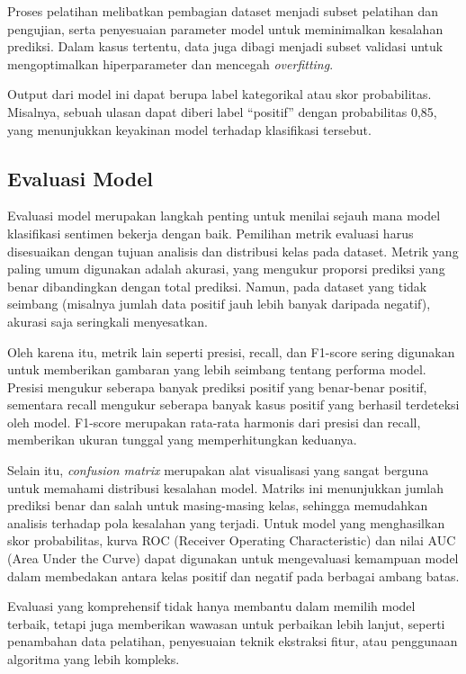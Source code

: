 Proses pelatihan melibatkan pembagian dataset menjadi subset pelatihan dan pengujian, serta penyesuaian parameter model untuk meminimalkan kesalahan prediksi. Dalam kasus tertentu, data juga dibagi menjadi subset validasi untuk mengoptimalkan hiperparameter dan mencegah \textit{overfitting}.

Output dari model ini dapat berupa label kategorikal atau skor probabilitas. Misalnya, sebuah ulasan dapat diberi label “positif” dengan probabilitas 0,85, yang menunjukkan keyakinan model terhadap klasifikasi tersebut.

\subsection{Evaluasi Model}

Evaluasi model merupakan langkah penting untuk menilai sejauh mana model klasifikasi sentimen bekerja dengan baik. Pemilihan metrik evaluasi harus disesuaikan dengan tujuan analisis dan distribusi kelas pada dataset. Metrik yang paling umum digunakan adalah akurasi, yang mengukur proporsi prediksi yang benar dibandingkan dengan total prediksi. Namun, pada dataset yang tidak seimbang (misalnya jumlah data positif jauh lebih banyak daripada negatif), akurasi saja seringkali menyesatkan.

Oleh karena itu, metrik lain seperti presisi, recall, dan F1-score sering digunakan untuk memberikan gambaran yang lebih seimbang tentang performa model. Presisi mengukur seberapa banyak prediksi positif yang benar-benar positif, sementara recall mengukur seberapa banyak kasus positif yang berhasil terdeteksi oleh model. F1-score merupakan rata-rata harmonis dari presisi dan recall, memberikan ukuran tunggal yang memperhitungkan keduanya.

Selain itu, \textit{confusion matrix} merupakan alat visualisasi yang sangat berguna untuk memahami distribusi kesalahan model. Matriks ini menunjukkan jumlah prediksi benar dan salah untuk masing-masing kelas, sehingga memudahkan analisis terhadap pola kesalahan yang terjadi. Untuk model yang menghasilkan skor probabilitas, kurva ROC (Receiver Operating Characteristic) dan nilai AUC (Area Under the Curve) dapat digunakan untuk mengevaluasi kemampuan model dalam membedakan antara kelas positif dan negatif pada berbagai ambang batas.

Evaluasi yang komprehensif tidak hanya membantu dalam memilih model terbaik, tetapi juga memberikan wawasan untuk perbaikan lebih lanjut, seperti penambahan data pelatihan, penyesuaian teknik ekstraksi fitur, atau penggunaan algoritma yang lebih kompleks.


